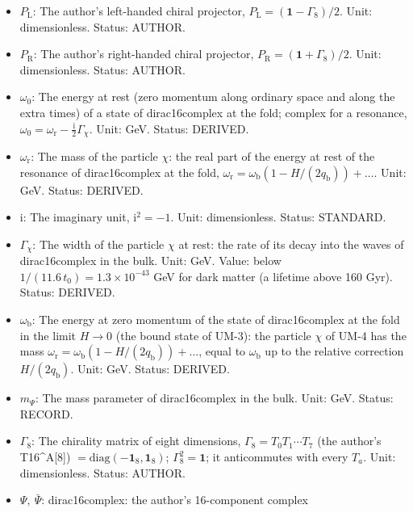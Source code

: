 \documentclass[
  10pt,
]{article}
\begin{document}
\begin{itemize}
  \(\gamma^{(0)}(\mu_{\mathrm{L}}P_{\mathrm{L}} + \mu_{\mathrm{R}}P_{\mathrm{R}})\);
  negative values attract. Unit: dimensionless. Status: DERIVED.
\item
  \(P_{\mathrm{L}}\): The author's left-handed chiral projector,
  \(P_{\mathrm{L}} = (\mathbf{1} - \Gamma_8)/2\). Unit: dimensionless.
  Status: AUTHOR.
\item
  \(P_{\mathrm{R}}\): The author's right-handed chiral projector,
  \(P_{\mathrm{R}} = (\mathbf{1} + \Gamma_8)/2\). Unit: dimensionless.
  Status: AUTHOR.
\item
  \(\omega_0\): The energy at rest (zero momentum along ordinary space
  and along the extra times) of a state of dirac16complex at the fold;
  complex for a resonance,
  \(\omega_0 = \omega_{\mathrm{r}} - \frac{\mathrm{i}}{2}\Gamma_\chi\).
  Unit: GeV. Status: DERIVED.
\item
  \(\omega_{\mathrm{r}}\): The mass of the particle \(\chi\): the real
  part of the energy at rest of the resonance of dirac16complex at the
  fold,
  \(\omega_{\mathrm{r}} = \omega_{\mathrm{b}}(1 - H/(2q_{\mathrm{b}})) + \dots\).
  Unit: GeV. Status: DERIVED.
\item
  \(\mathrm{i}\): The imaginary unit, \(\mathrm{i}^2 = -1\). Unit:
  dimensionless. Status: STANDARD.
\item
  \(\Gamma_\chi\): The width of the particle \(\chi\) at rest: the rate
  of its decay into the waves of dirac16complex in the bulk. Unit: GeV.
  Value: below \(1/(11.6\,t_0) = 1.3\times10^{-43}\) GeV for dark matter
  (a lifetime above 160 Gyr). Status: DERIVED.
\item
  \(\omega_{\mathrm{b}}\): The energy at zero momentum of the state of
  dirac16complex at the fold in the limit \(H \to 0\) (the bound state
  of UM-3): the particle \(\chi\) of UM-4 has the mass
  \(\omega_{\mathrm{r}} = \omega_{\mathrm{b}}(1 - H/(2q_{\mathrm{b}})) + \dots\),
  equal to \(\omega_{\mathrm{b}}\) up to the relative correction
  \(H/(2q_{\mathrm{b}})\). Unit: GeV. Status: DERIVED.
\item
  \(m_\Psi\): The mass parameter of dirac16complex in the bulk. Unit:
  GeV. Status: RECORD.
\item
  \(\Gamma_8\): The chirality matrix of eight dimensions,
  \(\Gamma_8 = T_0T_1\cdots T_7\) (the author's T16\^{}A{[}8{]})
  \(= \mathrm{diag}(-\mathbf{1}_8, \mathbf{1}_8)\);
  \(\Gamma_8^2 = \mathbf{1}\); it anticommutes with every \(T_a\). Unit:
  dimensionless. Status: AUTHOR.
\item
  \(\Psi,\ \bar\Psi\): dirac16complex: the author's 16-component complex

\end{itemize}
\end{document}

